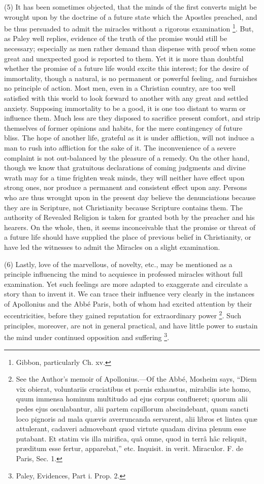 (5) It has been sometimes objected, that the
minds of the first converts might be wrought upon by the doctrine of a
future state which the Apostles preached, and be thus persuaded to
admit the miracles without a rigorous examination \footnote{Gibbon, particularly Ch. xv.}. But, as Paley well replies, evidence of the truth of the
promise would still be necessary; especially as men rather demand than
dispense with proof when some great and unexpected good is reported to
them. Yet it is more than doubtful whether the promise of a future
life would excite this interest; for the desire of immortality, though
a natural, is no permanent or powerful feeling, and furnishes no
principle of action. Most men, even in a Christian country, are too
well satisfied with this world to look forward to another with any
great and settled anxiety. Supposing immortality to be a good, it is
one too distant to warm or influence them. Much less are they disposed
to sacrifice present comfort, and strip themselves of former opinions
and habits, for the mere contingency of future bliss. The hope of
another life, grateful as it is under affliction, will not induce
a man to rush into affliction for the sake of it. The inconvenience of
a severe complaint is not out-balanced by the pleasure of a remedy. On
the other hand, though we know that gratuitous declarations of coming
judgments and divine wrath may for a time frighten weak minds, they
will neither have effect upon strong ones, nor produce a permanent and
consistent effect upon any. Persons who are thus wrought upon in the
present day believe the denunciations because they are in Scripture,
not Christianity because Scripture contains them. The authority of
Revealed Religion is taken for granted both by the preacher and his
hearers. On the whole, then, it seems inconceivable that the promise
or threat of a future life should have supplied the place of previous
belief in Christianity, or have led the witnesses to admit the
Miracles on a slight examination.

(6) Lastly, love of the marvellous, of novelty,
etc., may be mentioned as a principle influencing the mind to
acquiesce in professed miracles without full examination. Yet such
feelings are more adapted to exaggerate and circulate a story than to
invent it. We can trace their influence very clearly in the instances
of Apollonius and the Abbé Paris, both of whom had excited attention
by their eccentricities, before they gained reputation for
extraordinary power \footnote{See the Author's memoir of Apollonius.—Of the Abbé, Mosheim says, ``Diem
vix obierat, voluntariis cruciatibus et pœnis exhaustus, mirabilis
iste homo, quum immensa hominum multitudo ad ejus corpus conflueret;
quorum alii pedes ejus osculabantur, alii partem capillorum
abscindebant, quam sancti loco pignoris ad mala quævis averruncanda
servarent, alii libros et lintea quæ attulerant, cadaveri admovebant
quod virtute quadam divina plenum esse putabant. Et statim vis illa
mirifica, quâ omne, quod in terrâ hâc reliquit, præditum esse
fertur, apparebat,'' etc. Inquisit. in verit. Miraculor. F. de Paris,
Sec. 1.}.
Such principles, moreover, are not in general practical, and have
little power to sustain the mind under continued opposition and
suffering \footnote{Paley, Evidences, Part i. Prop. 2.}.

